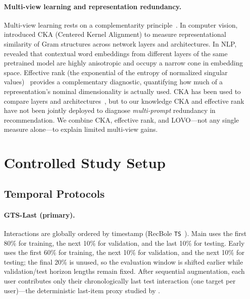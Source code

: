 \documentclass[sigconf,natbib=true,anonymous]{acmart}
\begin{document}
\paragraph{Multi-view learning and representation redundancy.}
Multi-view learning rests on a complementarity principle~\cite{xu2013multiview}.
In computer vision, \citet{kornblith2019cka} introduced CKA (Centered Kernel Alignment) to measure representational similarity of Gram structures across network layers and architectures.
In NLP, \citet{ethayarajh2019contextual} revealed that contextual word embeddings from different layers of the same pretrained model are highly anisotropic and occupy a narrow cone in embedding space.
Effective rank (the exponential of the entropy of normalized singular values)~\cite{roy2007effective} provides a complementary diagnostic, quantifying how much of a representation's nominal dimensionality is actually used.
CKA has been used to compare layers and architectures~\cite{kornblith2019cka}, but to our knowledge CKA and effective rank have not been jointly deployed to diagnose \emph{multi-prompt} redundancy in recommendation.
We combine CKA, effective rank, and LOVO---not any single measure alone---to explain limited multi-view gains.

\section{Controlled Study Setup}
\label{sec:setup}

\subsection{Temporal Protocols}
\label{sec:protocol}

\paragraph{GTS-Last (primary).}
Interactions are globally ordered by timestamp (RecBole \texttt{TS}~\cite{zhao2021recbole}).
Main uses the first 80\% for training, the next 10\% for validation, and the last 10\% for testing.
Early uses the first 60\% for training, the next 10\% for validation, and the next 10\% for testing; the final 20\% is unused, so the evaluation window is shifted earlier while validation/test horizon lengths remain fixed.
After sequential augmentation, each user contributes only their chronologically last test interaction (one target per user)---the deterministic last-item proxy studied by \citet{gusak2025time}.
\end{document}
